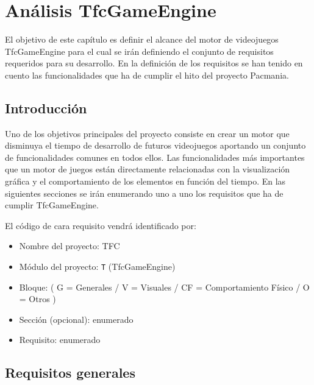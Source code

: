 \chapter{Análisis TfcGameEngine}
El objetivo de este capítulo es definir el alcance del motor de videojuegos TfcGameEngine para el cual se irán definiendo el conjunto de requisitos requeridos para su desarrollo. En la definición de los requisitos se han tenido en cuento las funcionalidades que ha de cumplir el hito del proyecto Pacmania. 

\newpage


\section{Introducción}

Uno de los objetivos principales del proyecto consiste en crear un motor que disminuya el tiempo de desarrollo de futuros videojuegos aportando un conjunto de funcionalidades comunes en todos ellos. 
Las funcionalidades más importantes que un motor de juegos están directamente relacionadas con la visualización gráfica y el comportamiento de los elementos en función del tiempo. En las siguientes secciones se irán enumerando uno a uno los requisitos que ha de cumplir TfcGameEngine.
\newline

El código de cara requisito vendrá identificado por:
\begin{itemize}
\item Nombre del proyecto: TFC
\item Módulo del proyecto:  \texttt{T} (TfcGameEngine)
\item Bloque:   ( G = Generales / V = Visuales / CF =  Comportamiento Físico / O = Otros )
\item Sección (opcional): enumerado
\item Requisito: enumerado
\end{itemize}



\section{Requisitos generales}

